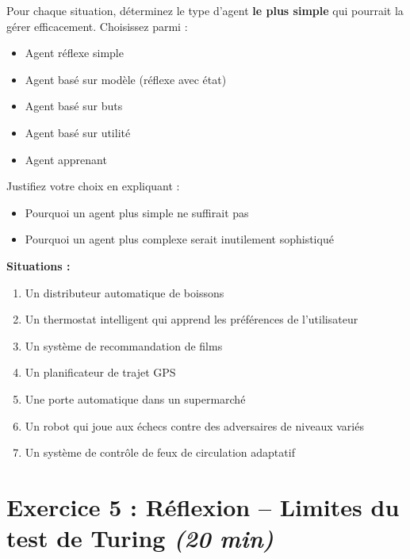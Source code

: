 \documentclass[11pt,a4paper]{article}
\begin{document}
\begin{exercicebox}[Énoncé]
Pour chaque situation, déterminez le type d'agent \textbf{le plus simple} qui pourrait la gérer efficacement. Choisissez parmi :
\begin{itemize}
    \item Agent réflexe simple
    \item Agent basé sur modèle (réflexe avec état)
    \item Agent basé sur buts
    \item Agent basé sur utilité
    \item Agent apprenant
\end{itemize}

Justifiez votre choix en expliquant :
\begin{itemize}
    \item Pourquoi un agent plus simple ne suffirait pas
    \item Pourquoi un agent plus complexe serait inutilement sophistiqué
\end{itemize}

\textbf{Situations :}
\begin{enumerate}
    \item Un distributeur automatique de boissons
    \item Un thermostat intelligent qui apprend les préférences de l'utilisateur
    \item Un système de recommandation de films
    \item Un planificateur de trajet GPS
    \item Une porte automatique dans un supermarché
    \item Un robot qui joue aux échecs contre des adversaires de niveaux variés
    \item Un système de contrôle de feux de circulation adaptatif
\end{enumerate}
\end{exercicebox}

\vspace{1cm}

\section*{Exercice 5 : Réflexion -- Limites du test de Turing \hfill \textit{(20 min)}}
\end{document}

